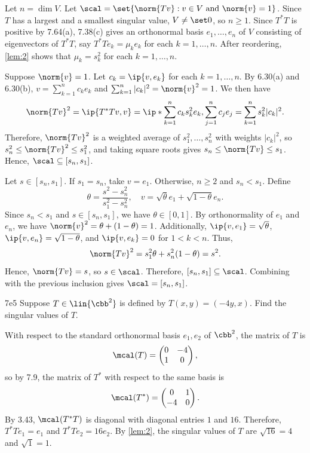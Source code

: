 \begin{sol}
    Let $n = \dim V$.
    Let $\scal = \set{\norm{Tv} : v \in V \text{ and } \norm{v} = 1}$.
    Since $T$ has a largest and a smallest singular value, $V \neq \set 0$, so $n \geq 1$.
    Since $T^\ast T$ is positive by 7.64(a), 7.38(c) gives an orthonormal basis $e_1, \ldots, e_n$ of $V$ consisting of eigenvectors of $T^\ast T$, say $T^\ast T e_k = \mu_k e_k$ for each $k = 1, \ldots, n$.
    After reordering, \autoref{lem:2} shows that $\mu_k = s_k^2$ for each $k = 1, \ldots, n$.

    \rightset Suppose $\norm{v} = 1$.
    Let $c_k = \ip{v, e_k}$ for each $k = 1, \ldots, n$.
    By 6.30(a) and 6.30(b), $v = \sum_{k=1}^n c_k e_k$ and $\sum_{k=1}^n |c_k|^2 = \norm{v}^2 = 1$.
    We then have
    \[
        \norm{Tv}^2 = \ip{T^\ast Tv, v} = \ip*{\sum_{k=1}^n c_k s_k^2 e_k, \sum_{j=1}^n c_j e_j} = \sum_{k=1}^n s_k^2 |c_k|^2.
    \]
    Therefore, $\norm{Tv}^2$ is a weighted average of $s_1^2, \ldots, s_n^2$ with weights $|c_k|^2$, so $s_n^2 \leq \norm{Tv}^2 \leq s_1^2$, and taking square roots gives $s_n \leq \norm{Tv} \leq s_1$.
    Hence, $\scal \subseteq [s_n, s_1]$.

    \leftset Let $s \in [s_n, s_1]$.
    If $s_1 = s_n$, take $v = e_1$.
    Otherwise, $n \geq 2$ and $s_n < s_1$.
    Define
    \[
        \theta = \frac{s^2 - s_n^2}{s_1^2 - s_n^2}, \quad v = \sqrt{\theta} e_1 + \sqrt{1 - \theta} e_n.
    \]
    Since $s_n < s_1$ and $s \in [s_n, s_1]$, we have $\theta \in [0, 1]$.
    By orthonormality of $e_1$ and $e_n$, we have $\norm{v}^2 = \theta + (1 - \theta) = 1$.
    Additionally, $\ip{v, e_1} = \sqrt{\theta}$, $\ip{v, e_n} = \sqrt{1 - \theta}$, and $\ip{v, e_k} = 0$ for $1 < k < n$.
    Thus,
    \[
        \norm{Tv}^2 = s_1^2 \theta + s_n^2 (1 - \theta) = s^2.
    \]
    Hence, $\norm{Tv} = s$, so $s \in \scal$.
    Therefore, $[s_n, s_1] \subseteq \scal$.
    Combining with the previous inclusion gives $\scal = [s_n, s_1]$.
\end{sol}

\begin{exercise}{7e5}
    Suppose $T \in \lin{\cbb^2}$ is defined by $T(x, y) = (-4y, x)$.
    Find the singular values of $T$.
\end{exercise}

\begin{sol}
    With respect to the standard orthonormal basis $e_1, e_2$ of $\cbb^2$, the matrix of $T$ is
    \[
        \mcal(T) =
        \begin{pmatrix}
            0 & -4 \\
            1 & 0
        \end{pmatrix},
    \]
    so by 7.9, the matrix of $T^\ast$ with respect to the same basis is
    \[
        \mcal(T^\ast) =
        \begin{pmatrix}
            0 & 1 \\
            -4 & 0
        \end{pmatrix}.
    \]
    By 3.43, $\mcal(T^\ast T)$ is diagonal with diagonal entries $1$ and $16$.
    Therefore, $T^\ast T e_1 = e_1$ and $T^\ast T e_2 = 16 e_2$.
    By \autoref{lem:2}, the singular values of $T$ are $\sqrt{16} = 4$ and $\sqrt{1} = 1$.
\end{sol}

